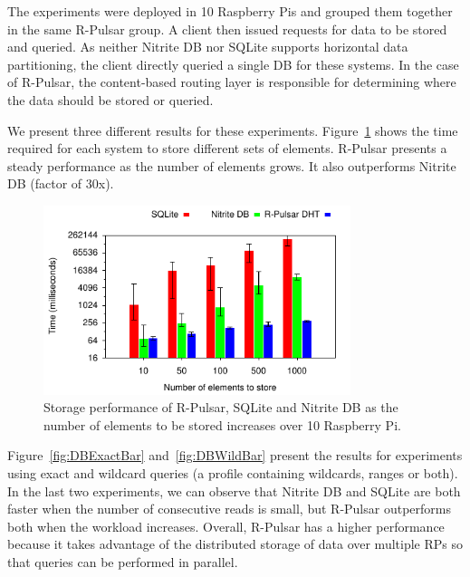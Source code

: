The experiments were deployed in 10 Raspberry Pis and grouped them together in the same R-Pulsar group. A client then issued requests for data to be stored and queried. As neither Nitrite DB nor SQLite supports horizontal data partitioning, the client directly queried a single DB for these systems. In the case of R-Pulsar, the content-based routing layer is responsible for determining where the data should be stored or queried.

We present three different results for these experiments. Figure~\ref{fig:DBInsertBar} shows the time required for each system to store different sets of elements. R-Pulsar presents a steady performance as the number of elements grows. It also outperforms Nitrite DB (factor of 30x).

\begin{figure}[h!]
  \centering
  \includegraphics[width=0.8\textwidth]{Results/DBInsertBar}
  \caption{Storage performance of R-Pulsar, SQLite and Nitrite DB as the number of elements to be stored increases over 10 Raspberry Pi.}
  \label{fig:DBInsertBar}
\end{figure}

Figure~\ref{fig:DBExactBar} and~\ref{fig:DBWildBar} present the results for experiments using exact and wildcard queries (a profile containing wildcards, ranges or both).
In the last two experiments, we can observe that Nitrite DB and SQLite are both faster when the number of consecutive reads is small, but R-Pulsar outperforms both when the workload increases. 
Overall, R-Pulsar has a higher performance because it takes advantage of the distributed storage of data over multiple RPs so that queries can be performed in parallel.

